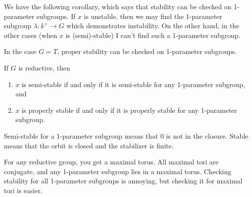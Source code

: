 We have the following corollary, which says that stability can be checked on 1-parameter subgroups. If $x$ is unstable, then we may find the 1-parameter subgroup $\lambda\colon k^\times\to G$ which demonstrates instability. On the other hand, in the other cases (when $x$ is (semi)-stable) I can't find such a 1-parameter subgroup.
\begin{corollary}
 In the case $G=T$, proper stability can be checked on 1-parameter subgroups.
\end{corollary}
\begin{theorem}
 If $G$ is reductive, then 
 \begin{enumerate}
  \item $x$ is semi-stable if and only if it is semi-stable for any 1-parameter subgroup, and
  \item $x$ is properly stable if and only if it is properly stable for any 1-parameter subgroup.
 \end{enumerate}
\end{theorem}
Semi-stable for a 1-parameter subgroup means that 0 is not in the closure. Stable means that the orbit is closed and the stabilizer is finite.

For any reductive group, you get a maximal torus. All maximal tori are conjugate, and any 1-parameter subgroup lies in a maximal torus. Checking stability for all 1-parameter subgroups is annoying, but checking it for maximal tori is easier.

